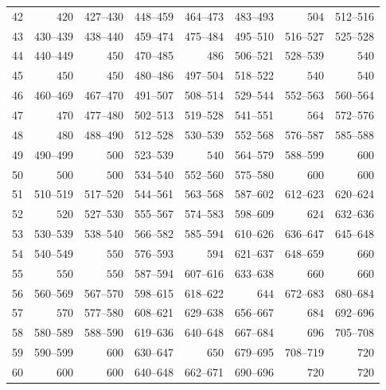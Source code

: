 \begin{longtable}{@{}r*{7}{r}@{}}
42&\(420\)&427--430&448--459&464--473&483--493&\(504\)&512--516\\
43&430--439&438--440&459--474&475--484&495--510&516--527&525--528\\
44&440--449&\(450\)&470--485&\(486\)&506--521&528--539&\(540\)\\
45&\(450\)&\(450\)&480--486&497--504&518--522&\(540\)&\(540\)\\
46&460--469&467--470&491--507&508--514&529--544&552--563&560--564\\
47&\(470\)&477--480&502--513&519--528&541--551&\(564\)&572--576\\
48&\(480\)&488--490&512--528&530--539&552--568&576--587&585--588\\
49&490--499&\(500\)&523--539&\(540\)&564--579&588--599&\(600\)\\
50&\(500\)&\(500\)&534--540&552--560&575--580&\(600\)&\(600\)\\
51&510--519&517--520&544--561&563--568&587--602&612--623&620--624\\
52&\(520\)&527--530&555--567&574--583&598--609&\(624\)&632--636\\
53&530--539&538--540&566--582&585--594&610--626&636--647&645--648\\
54&540--549&\(550\)&576--593&\(594\)&621--637&648--659&\(660\)\\
55&\(550\)&\(550\)&587--594&607--616&633--638&\(660\)&\(660\)\\
56&560--569&567--570&598--615&618--622&\(644\)&672--683&680--684\\
57&\(570\)&577--580&608--621&629--638&656--667&\(684\)&692--696\\
58&580--589&588--590&619--636&640--648&667--684&\(696\)&705--708\\
59&590--599&\(600\)&630--647&\(650\)&679--695&708--719&\(720\)\\
60&\(600\)&\(600\)&640--648&662--671&690--696&\(720\)&\(720\)\\
\end{longtable}
\endgroup
